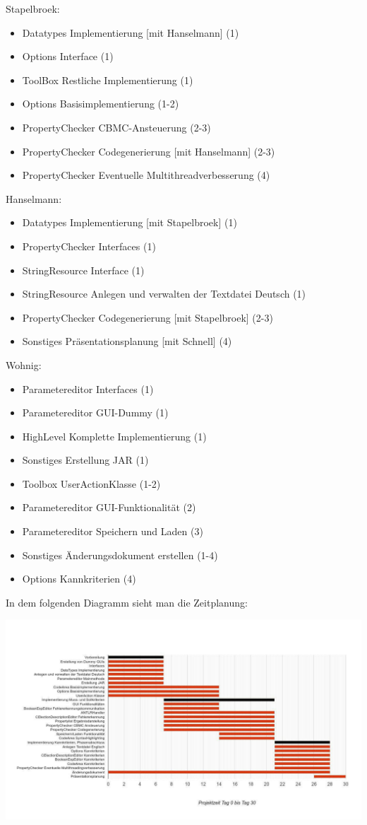 \documentclass[a4paper]{scrreprt}
\begin{document}
\vspace{8mm}
Stapelbroek:
\begin{itemize}
\item Datatypes Implementierung [mit Hanselmann] (1)
\item Options Interface (1)
\item ToolBox Restliche Implementierung (1)
\item Options Basisimplementierung (1-2)
\item PropertyChecker CBMC-Ansteuerung (2-3) 
\item PropertyChecker Codegenerierung [mit Hanselmann] (2-3) 
\item PropertyChecker Eventuelle Multithreadverbesserung (4)
\end{itemize}
\vspace{8mm}
Hanselmann:
\begin{itemize}
\item Datatypes Implementierung [mit Stapelbroek] (1)
\item PropertyChecker Interfaces (1)
\item StringResource Interface (1)
\item StringResource Anlegen und verwalten der Textdatei Deutsch (1)
\item PropertyChecker Codegenerierung [mit Stapelbroek] (2-3)
\item Sonstiges Präsentationsplanung [mit Schnell] (4)
\end{itemize}
\vspace{8mm}
Wohnig:
\begin{itemize}
\item Parametereditor Interfaces (1)
\item Parametereditor GUI-Dummy (1)
\item HighLevel Komplette Implementierung (1)
\item Sonstiges Erstellung JAR (1)
\item Toolbox UserActionKlasse (1-2)
\item Parametereditor GUI-Funktionalität (2)
\item Parametereditor Speichern und Laden (3)
\item Sonstiges Änderungsdokument erstellen (1-4)
\item Options Kannkriterien (4)
\end{itemize}
\vspace{8mm}
In dem folgenden Diagramm sieht man die Zeitplanung: \\
\begin{landscape}
\includegraphics[width=1.4\textwidth] {planung.jpg}
\end{landscape}
\end{document}
